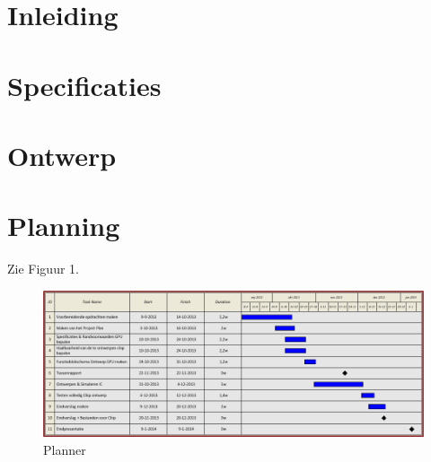 \documentclass{scrartcl}
\begin{document}


\tableofcontents
\pagebreak
\section{Inleiding}

\autocite{GeForce}

\section{Specificaties}


\section{Ontwerp}


\section{Planning}
Zie Figuur 1.
\begin{figure}[H]
\centering
        \includegraphics[width=\linewidth]{inputfiles/planner.png}
        \caption{Planner}
        \label{fig:planner}
\end{figure}

\printbibliography
\end{document}
